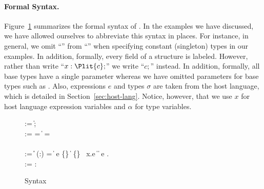\paragraph*{Formal Syntax.}
Figure~\ref{fig:ipads-syntax} summarizes the formal syntax of \ipads.
In the examples we have discussed, we have allowed ourselves to
abbreviate this syntax in places.  For instance, in general, we omit
``'' from ``'' when specifying constant
(singleton) types in our examples.  In addition, formally, every field
of a structure is labeled.  However, rather than write ``$x :
\Plit{c};$'' we write ``$c;$'' instead.  In addition, formally, all
base types \Pbase{} have a single parameter whereas we have omitted
parameters for base types such as \Puint.  Also, expressions $e$ and
types $\sigma$ are taken from the host language, which is detailed in
Section~\ref{sec:host-lang}. Notice, however, that we use
$x$ for host language expression variables and $\alpha$ for \ipads{}
type variables. 


\begin{figure}
\begin{bnf}
    \::=  \| ; \; \\
    \::= \alpha = 
  \|  \Prec{} \; \alpha =  \\ \\
    \::= 
     \| \alpha \| \Plit{\const} \nlalt
    \Pfun{} (\var:\ity) =  \| \; e \nlalt
    \Pstruct{} \{\} \| 
    \Punion{} \{\} \nlalt
     \; \Pwhere{} \, x.e \| 
    \Popt{}\;  \nlalt 
     \| 
    \Pcompute{} \; e \nlalt
    \Prec{} \; \alpha . 
    \\
     \::= \var : 
\end{bnf}
\caption{\ipads{} Syntax}
\label{fig:ipads-syntax}
\end{figure}



